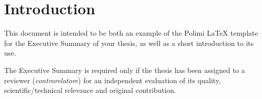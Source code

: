 \section{Introduction}
\label{sec:introduction}

This document is intended to be both an example of the Polimi \LaTeX{} template for the Executive Summary
of your thesis, as well as a short introduction to its use.

The Executive Summary is required only
if the thesis has been assigned to a reviewer (\textit{controrelatore})
for an independent evaluation of its quality, scientific/technical relevance and original contribution.
